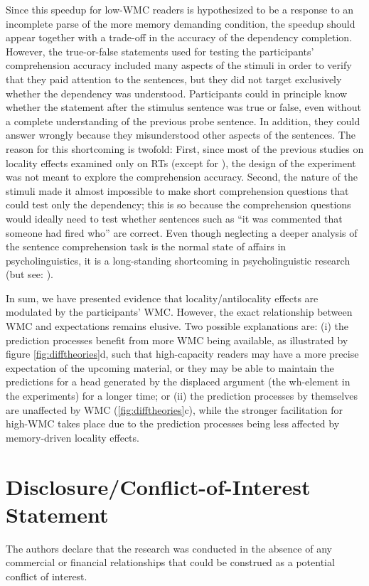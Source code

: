 \documentclass{frontiersSCNS}\usepackage{knitr}
\begin{document}
Since this speedup for low-WMC readers is hypothesized to be a response to an incomplete parse of the more memory demanding condition, the speedup should appear together with a trade-off in the accuracy of the dependency completion. However, the true-or-false statements used for testing the participants' comprehension accuracy included many aspects of the stimuli in order to verify that they paid attention to the sentences, but they did not target exclusively whether the dependency was understood. Participants could in principle know whether the statement after the stimulus sentence was true or false, even without a complete understanding of the previous probe sentence. In addition, they could answer wrongly because they misunderstood other aspects of the sentences. The reason for this shortcoming is twofold: First, since most of the previous studies on locality effects examined only on RTs (except for \citealp{McElreeEtAl2003}), the design of the experiment was not meant to explore the comprehension accuracy. Second, the nature of the stimuli made it almost impossible to make short comprehension questions that could test only the dependency; this is so because the comprehension questions  would ideally need to test whether sentences such as ``it was commented that someone had fired who'' are correct. Even though neglecting a deeper analysis of the sentence comprehension task is the normal state of affairs in psycholinguistics, it is a long-standing shortcoming in psycholinguistic research (but see: \citealp{ChristiansonEtAl2001,FerreiraEtAl2001}).

In sum, we have presented evidence that locality/antilocality effects are modulated by the participants' WMC. 
However, the exact relationship between WMC and expectations remains elusive. Two possible explanations are: (i) the prediction processes benefit from more WMC being available, as illustrated by figure \ref{fig:difftheories}d, such that high-capacity readers may have a more precise expectation of the upcoming material, or they  may be able to maintain the predictions for a head generated by the displaced argument (the wh-element in the experiments) for a longer time; or  (ii) the prediction processes by themselves are unaffected by WMC (\ref{fig:difftheories}c), while the stronger facilitation for high-WMC takes place due to the prediction processes being less affected by memory-driven locality effects.





\section*{Disclosure/Conflict-of-Interest Statement}
The authors declare that the research was conducted in the absence of any commercial or financial relationships that could be construed as a potential conflict of interest.
\end{document}
